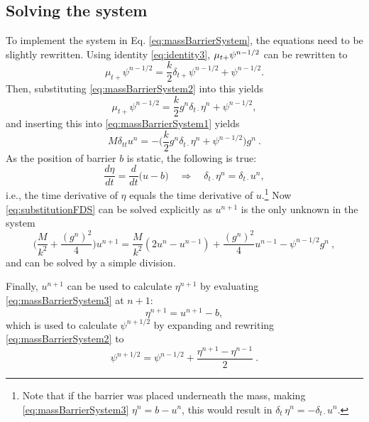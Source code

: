 \subsection{Solving the system}\label{sec:solvingMassBarrier}
To implement the system in Eq. \eqref{eq:massBarrierSystem}, the equations need to be slightly rewritten. Using identity \eqref{eq:identity3}, $\mu_{t+} \psi^{n-1/2}$ can be rewritten to
\begin{equation*}
    \mu_{t+}\psi^{n-1/2} = \frac{k}{2}\delta_{t+}\psi^{n-1/2} + \psi^{n-1/2}.
\end{equation*}
Then, substituting \eqref{eq:massBarrierSystem2} into this yields
\begin{equation}\nonumber
    \mu_{t+}\psi^{n-1/2} = \frac{k}{2}g^n\delta_{t\cdot}\eta^n + \psi^{n-1/2},
\end{equation}
and inserting this into \eqref{eq:massBarrierSystem1} yields
\begin{equation}\label{eq:substitutionFDS}
    M\delta_{tt}u^n = -\Big(\frac{k}{2}g^n\delta_{t\cdot}\eta^n + \psi^{n-1/2}\Big)g^n\ .
\end{equation}
As the position of barrier $b$ is static, the following is true:
\begin{equation}\label{eq:derEtaEqDerU}
    \frac{d\eta}{dt} = \frac{d}{dt}\Big(u - b\Big)\quad \Longrightarrow \quad \delta_{t\cdot}\eta^n = \delta_{t\cdot}u^n,
\end{equation}
i.e., the time derivative of $\eta$ equals the time derivative of $u$.\footnote{Note that if the barrier was placed underneath the mass, making \eqref{eq:massBarrierSystem3} $\eta^n = b-u^n$, this would result in $\delta_{t_\cdot}\eta^n = -\delta_{t\cdot}u^n$.} Now \eqref{eq:substitutionFDS} can be solved explicitly as $u^{n+1}$ is the only unknown in the system
\begin{equation}
    \bigg(\frac{M}{k^2} + \frac{(g^n)^2}{4}\bigg)u^{n+1} = \frac{M}{k^2}(2u^n-u^{n-1})+\frac{(g^n)^2}{4}u^{n-1}-\psi^{n-1/2}g^n\ ,
\end{equation}
and can be solved by a simple division. 

Finally, $u^{n+1}$ can be used to calculate $\eta^{n+1}$ by evaluating \eqref{eq:massBarrierSystem3} at $n+1$:
\begin{equation}\label{eq:etaNPlus1}
    \eta^{n+1} = u^{n+1}-b,
\end{equation}
which is used to calculate $\psi^{n+1/2}$ by expanding and rewriting \eqref{eq:massBarrierSystem2} to
\begin{equation}\label{eq:psiNPlusHalf}
    \psi^{n+1/2} = \psi^{n-1/2} + \frac{\eta^{n+1} - \eta^{n-1}}{2}\ .
\end{equation}

